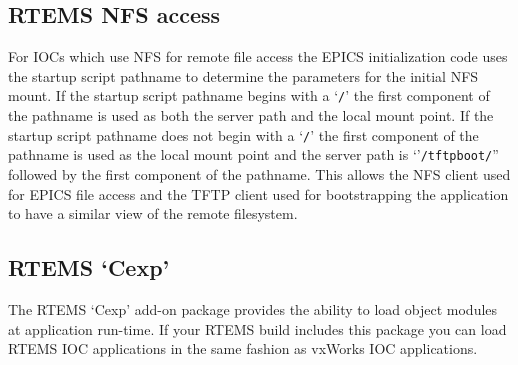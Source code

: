 \subsection{RTEMS NFS access}

For IOCs which use NFS for remote file access the EPICS initialization code uses the startup script pathname to 
determine the parameters for the initial NFS mount.  If the startup script pathname begins with a `\verb|/|' the first component 
of the pathname is used as both the server path and the local mount point. If the startup script pathname does not begin 
with a `\verb|/|' the first component of the pathname is used as the local mount point and the server path is `'\verb|/tftpboot/|'' 
followed by the first component of the pathname.  This allows the NFS client used for EPICS file access and the TFTP 
client used for bootstrapping the application to have a similar view of the remote filesystem.

\subsection{RTEMS `Cexp'}

The RTEMS `Cexp' add-on package provides the ability to load object modules at application run-time.  If your RTEMS 
build includes this package you can load RTEMS IOC applications in the same fashion as vxWorks IOC applications.




